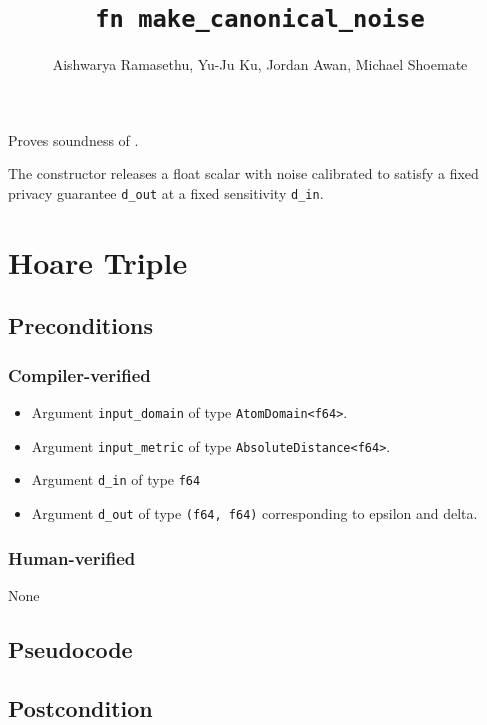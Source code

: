 \documentclass{article}
\title{\texttt{fn make\_canonical\_noise}}
\author{Aishwarya Ramasethu, Yu-Ju Ku, Jordan Awan, Michael Shoemate}
\begin{document}
\maketitle

\contrib

Proves soundness of .

The constructor releases a float scalar with noise calibrated to satisfy 
a fixed privacy guarantee \texttt{d\_out} at a fixed sensitivity \texttt{d\_in}.

\section{Hoare Triple}

\subsection*{Preconditions}
\subsubsection*{Compiler-verified}
\begin{itemize}
    \item Argument \texttt{input\_domain} of type \texttt{AtomDomain<f64>}.
    \item Argument \texttt{input\_metric} of type \texttt{AbsoluteDistance<f64>}.
    \item Argument \texttt{d\_in} of type \texttt{f64}
    \item Argument \texttt{d\_out} of type \texttt{(f64, f64)} corresponding to epsilon and delta.
\end{itemize}

\subsubsection*{Human-verified}
None

\subsection*{Pseudocode}



\subsection*{Postcondition}
\end{document}
